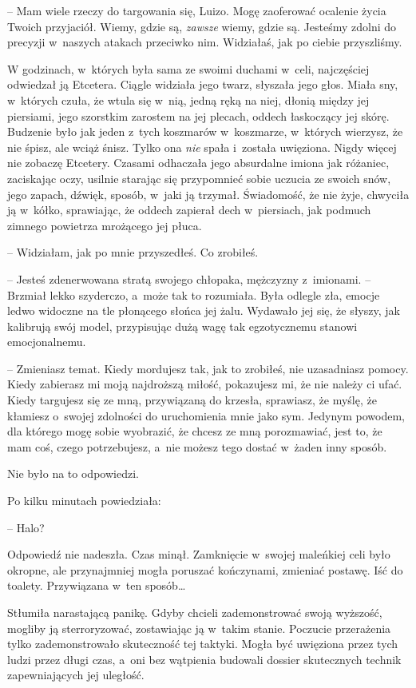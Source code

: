 \documentclass[oneside,polish,11pt,sfheadings]{mwbk}
\begin{document}
-- Mam wiele rzeczy do targowania się, Luizo. Mogę zaoferować ocalenie
życia Twoich przyjaciół. Wiemy, gdzie są, \textit{zawsze} wiemy, gdzie są.
Jesteśmy zdolni do precyzji w~naszych atakach przeciwko nim. Widziałaś,
jak po ciebie przyszliśmy.

W godzinach, w~których była sama ze swoimi duchami w~celi, najczęściej
odwiedzał ją Etcetera. Ciągle widziała jego twarz, słyszała jego głos.
Miała sny, w~których czuła, że wtula się w~nią, jedną ręką na niej,
dłonią między jej piersiami, jego szorstkim zarostem na jej plecach,
oddech łaskoczący jej skórę. Budzenie było jak jeden z~tych koszmarów w~koszmarze, w~których wierzysz, że nie śpisz, ale wciąż śnisz. Tylko ona
\textit{nie} spała i~została uwięziona. Nigdy więcej nie zobaczę Etcetery.
Czasami odhaczała jego absurdalne imiona jak różaniec, zaciskając oczy,
usilnie starając się przypomnieć sobie uczucia ze swoich snów, jego
zapach, dźwięk, sposób, w~jaki ją trzymał. Świadomość, że nie żyje,
chwyciła ją w~kółko, sprawiając, że oddech zapierał dech w~piersiach,
jak podmuch zimnego powietrza mrożącego jej płuca.

-- Widziałam, jak po mnie przyszedłeś. Co zrobiłeś.

-- Jesteś zdenerwowana stratą swojego chłopaka, mężczyzny z~imionami. -- Brzmiał lekko szyderczo, a~może tak to rozumiała. Była odlegle zła,
emocje ledwo widoczne na tle płonącego słońca jej żalu. Wydawało jej
się, że słyszy, jak kalibrują swój model, przypisując dużą wagę tak
egzotycznemu stanowi emocjonalnemu.

-- Zmieniasz temat. Kiedy mordujesz tak, jak to zrobiłeś, nie uzasadniasz
pomocy. Kiedy zabierasz mi moją najdroższą miłość, pokazujesz mi, że nie
należy ci ufać. Kiedy targujesz się ze mną, przywiązaną do krzesła,
sprawiasz, że myślę, że kłamiesz o~swojej zdolności do uruchomienia mnie
jako sym. Jedynym powodem, dla którego mogę sobie wyobrazić, że chcesz
ze mną porozmawiać, jest to, że mam coś, czego potrzebujesz, a~nie
możesz tego dostać w~żaden inny sposób.

Nie było na to odpowiedzi.

Po kilku minutach powiedziała: 

-- Halo?

Odpowiedź nie nadeszła. Czas minął. Zamknięcie w~swojej maleńkiej celi
było okropne, ale przynajmniej mogła poruszać kończynami, zmieniać
postawę. Iść do toalety. Przywiązana w~ten sposób\ldots 

Stłumiła narastającą panikę. Gdyby chcieli zademonstrować swoją
wyższość, mogliby ją sterroryzować, zostawiając ją w~takim stanie.
Poczucie przerażenia tylko zademonstrowało skuteczność tej taktyki.
Mogła być uwięziona przez tych ludzi przez długi czas, a~oni bez
wątpienia budowali dossier skutecznych technik zapewniających jej
uległość.
\end{document}
